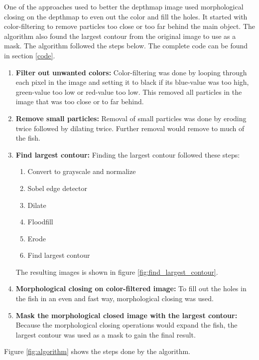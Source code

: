 One of the approaches used to better the depthmap image used morphological closing on the depthmap to even out the color and fill the holes. It started with color-filtering to remove particles too close or too far behind the main object. The algorithm also found the largest contour from the original image to use as a mask. The algorithm followed the steps below. The complete code can be found in section \ref{code}.
\begin{enumerate}
    \item \textbf{Filter out unwanted colors:}
    Color-filtering was done by looping through each pixel in the image and setting it to black if its blue-value was too high, green-value too low or red-value too low. This removed all particles in the image that was too close or to far behind. 
    \item \textbf{Remove small particles:}
    Removal of small particles was done by eroding twice followed by dilating twice. Further removal would remove to much of the fish.
    \item \textbf{Find largest contour:}
    Finding the largest contour followed these steps: \cite{website:largest_contour_code_explanation}
    \begin{enumerate}[label*=\arabic*.]
        \item Convert to grayscale and normalize
        \item Sobel edge detector
        \item Dilate
        \item Floodfill
        \item Erode
        \item Find largest contour
    \end{enumerate}
    The resulting images is shown in figure \ref{fig:find_largest_contour}.
    \item \textbf{Morphological closing on color-filtered image:}
    To fill out the holes in the fish in an even and fast way, morphological closing was used.
    \item \textbf{Mask the morphological closed image with the largest contour:}
    Because the morphological closing operations would expand the fish, the largest contour was used as a mask to gain the final result. 
\end{enumerate}

Figure \ref{fig:algorithm} shows the steps done by the algorithm.


